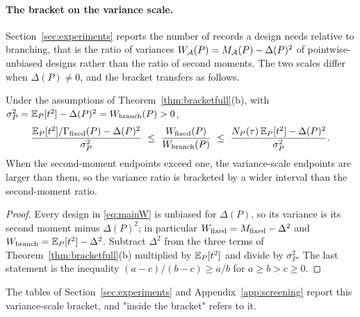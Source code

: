 \paragraph{The bracket on the variance scale.}
Section~\ref{sec:experiments} reports the number of records a design needs
relative to branching, that is the ratio of variances
$W_\mathcal A(P)=M_\mathcal A(P)-\Delta(P)^2$ of pointwise-unbiased designs rather than the
ratio of second moments. The two scales differ when $\Delta(P)\neq0$, and the
bracket transfers as follows.

\begin{corollary}\label{cor:bracketvar}
Under the assumptions of Theorem~\ref{thm:bracketfull}(b), with
$\sigma_P^2=\mathbb{E}_P[t^2]-\Delta(P)^2=W_{\rm branch}(P)>0$,
\[
 \frac{\mathbb{E}_P[t^2]/\Gamma_{\rm fixed}(P)-\Delta(P)^2}{\sigma_P^2}
 \ \le\ \frac{W_{\rm fixed}(P)}{W_{\rm branch}(P)}
 \ \le\ \frac{N_P(\tau)\,\mathbb{E}_P[t^2]-\Delta(P)^2}{\sigma_P^2}.
\]
When the second-moment endpoints exceed one, the variance-scale endpoints are
larger than them, so the variance ratio is bracketed by a wider interval
than the second-moment ratio.
\end{corollary}
\begin{proof}
Every design in \eqref{eq:mainW} is unbiased for $\Delta(P)$, so its variance
is its second moment minus $\Delta(P)^2$; in particular
$W_{\rm fixed}=M_{\rm fixed}-\Delta^2$ and $W_{\rm branch}=\mathbb{E}_P[t^2]-\Delta^2$.
Subtract $\Delta^2$ from the three terms of Theorem~\ref{thm:bracketfull}(b)
multiplied by $\mathbb{E}_P[t^2]$ and divide by $\sigma_P^2$. The last statement is
the inequality $(a-c)/(b-c)\ge a/b$ for $a\ge b>c\ge0$.
\end{proof}
The tables of Section~\ref{sec:experiments} and Appendix~\ref{app:screening}
report this variance-scale bracket, and "inside the bracket" refers to it.
